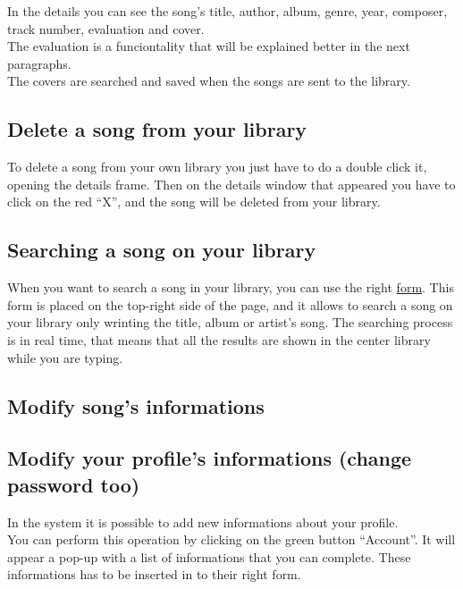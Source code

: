 In the details you can see the song's title, author, album, genre, year,
composer, track number, evaluation and cover.\\
The evaluation is a funciontality that will be explained better in the next
paragraphs.\\
The covers are searched and saved when the songs are sent to the library.

\subsection*{Delete a song from your library}

To delete a song from your own library you just have to do a double click it, opening 
the details frame. Then on the details window that appeared you have to
click on the red ``X'', and the song will be deleted from your library.

\subsection*{Searching a song on your library}

When you want to search a song in your library, you can use the right \underline{form}. This
form is placed on the top-right side of the page, and it allows to search a song
on your library only wrinting the title, album or artist's song. The searching
process is in real time, that means that all the results are shown in the center
library while you are typing.


\subsection*{Modify song's informations}

\subsection*{Modify your profile's informations (change password too)}

In the  system it is possible to add new informations about your
profile.\\
You can perform this operation by clicking on the green button ``Account''. It
will appear a pop-up with a list of informations that you can complete. These
informations has to be inserted in to their right form.

